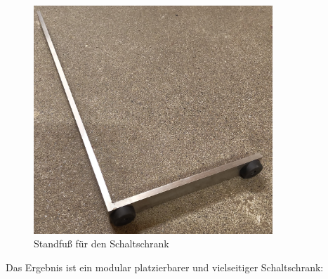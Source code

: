 \begin{figure}[H]
	\centering
	\includegraphics[width=9cm]{../ref/Schaltschrank_Fuss.jpeg}
	\caption{Standfuß für den Schaltschrank}
	\label{fig:schaltschrankfuss}
\end{figure}

Das Ergebnis ist ein modular platzierbarer und vielseitiger Schaltschrank:

